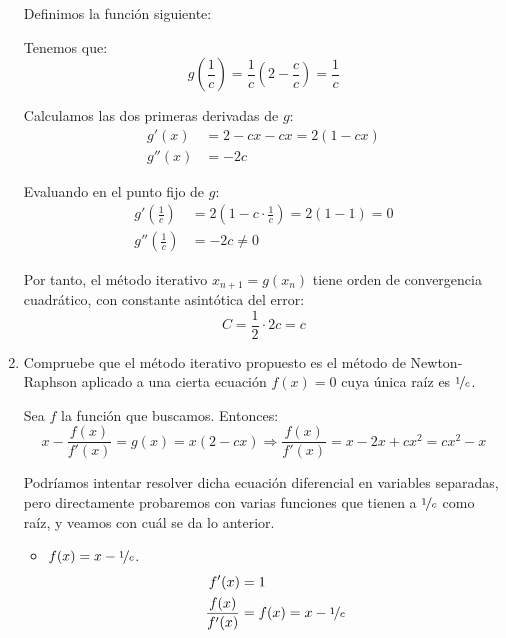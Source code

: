 \begin{ejercicio}
\begin{enumerate}
        Definimos la función siguiente:

        Tenemos que:
        \begin{equation*}
            g\left(\frac{1}{c}\right)=\frac{1}{c}\left(2-\frac{c}{c}\right)=\frac{1}{c}
        \end{equation*}

        Calculamos las dos primeras derivadas de $g$:
        \begin{align*}
            g'(x)&=2-cx-cx=2(1-cx)\\
            g''(x)&=-2c
        \end{align*}

        Evaluando en el punto fijo de $g$:
        \begin{align*}
            g'\left(\frac{1}{c}\right)&=2(1-c\cdot\frac{1}{c})=2(1-1)=0\\
            g''\left(\frac{1}{c}\right)&=-2c\neq 0
        \end{align*}

        Por tanto, el método iterativo $x_{n+1}=g(x_n)$ tiene orden de convergencia cuadrático, con constante asintótica del error:
        \begin{equation*}
            C=\frac{1}{2}\cdot 2c=c
        \end{equation*}
        \item Compruebe que el método iterativo propuesto es el método de Newton-Raphson aplicado a una cierta ecuación $f(x) = 0$ cuya única raíz es $\nicefrac{1}{c}$.
        
        Sea $f$ la función que buscamos. Entonces:
        \begin{equation*}
            x-\dfrac{f(x)}{f'(x)} = g(x)=x(2-cx)
            \Longrightarrow
            \dfrac{f(x)}{f'(x)}=x-2x+cx^2=cx^2-x
        \end{equation*}

        Podríamos intentar resolver dicha ecuación diferencial en variables separadas, pero directamente probaremos con varias funciones que tienen a $\nicefrac{1}{c}$ como raíz, y veamos con cuál se da lo anterior.
        \begin{itemize}
            \item $f(x)=x-\nicefrac{1}{c}$.
            \begin{align*}
                f'(x)&=1\\
                \dfrac{f(x)}{f'(x)}&=f(x)=x-\nicefrac{1}{c}
            \end{align*}


\end{itemize}
\end{enumerate}
\end{ejercicio}
